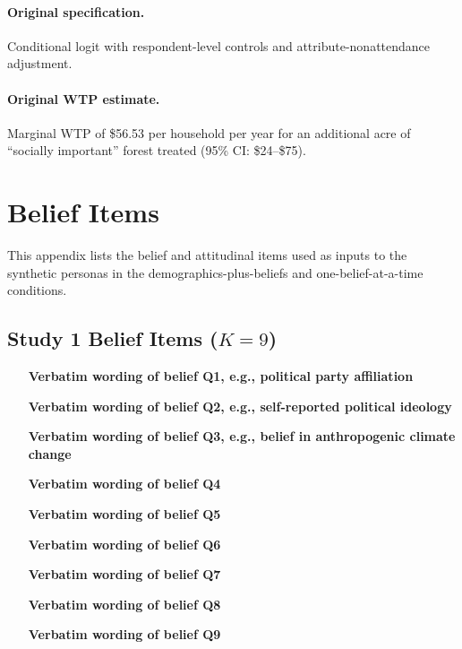 \documentclass[12pt]{article}
\begin{document}
\paragraph{Original specification.} Conditional logit with respondent-level controls and attribute-nonattendance adjustment.

\paragraph{Original WTP estimate.} Marginal WTP of \$56.53 per household per year for an additional acre of ``socially important'' forest treated (95\% CI: \$24--\$75).

\section{Belief Items}\label{app:belief-items}

This appendix lists the belief and attitudinal items used as inputs to the synthetic personas in the demographics-plus-beliefs and one-belief-at-a-time conditions.

\subsection{Study 1 Belief Items ($K = 9$)}

\begin{enumerate}[label=Q\arabic*., leftmargin=*]
    \item [\textbf{Verbatim wording of belief Q1, e.g., political party affiliation}]
    \item [\textbf{Verbatim wording of belief Q2, e.g., self-reported political ideology}]
    \item [\textbf{Verbatim wording of belief Q3, e.g., belief in anthropogenic climate change}]
    \item [\textbf{Verbatim wording of belief Q4}]
    \item [\textbf{Verbatim wording of belief Q5}]
    \item [\textbf{Verbatim wording of belief Q6}]
    \item [\textbf{Verbatim wording of belief Q7}]
    \item [\textbf{Verbatim wording of belief Q8}]
    \item [\textbf{Verbatim wording of belief Q9}]
\end{enumerate}
\end{document}
